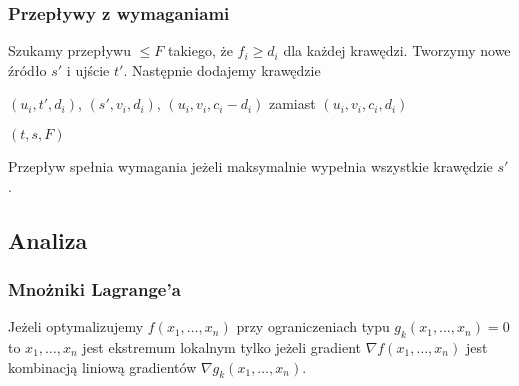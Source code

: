 \subsubsection{Przepływy z wymaganiami}
Szukamy przepływu $\leq F$ takiego, że $f_i \geq d_i$ dla każdej krawędzi.
Tworzymy nowe źródło $s'$ i ujście $t'$.
Następnie dodajemy krawędzie
\begin{compactitem}
  \item $(u_i, t', d_i)$, $(s', v_i, d_i)$, $(u_i, v_i, c_i - d_i)$ zamiast $(u_i, v_i, c_i, d_i)$ 
  \item $(t, s, F)$
\end{compactitem}
Przepływ spełnia wymagania jeżeli maksymalnie wypełnia wszystkie krawędzie $s'$.

\subsection{Analiza}
\subsubsection{Mnożniki Lagrange'a}
Jeżeli optymalizujemy $f(x_1, \dots, x_n)$ przy ograniczeniach typu $g_k(x_1, \dots, x_n) = 0$ to
$x_1, \dots, x_n$ jest ekstremum lokalnym tylko jeżeli gradient $\nabla f(x_1, \dots, x_n)$ jest
kombinacją liniową gradientów $\nabla g_k(x_1, \dots, x_n)$.
